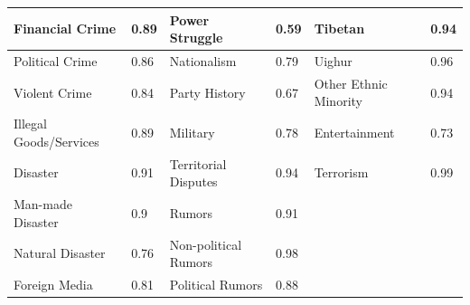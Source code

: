 \documentclass[12pt]{article}
\begin{document}
\begin{CJK*}{UTF8}{gbsn}
\begin{table}[H]
{\begin{tabular}{|p{5cm}|l|p{5cm}|l|p{5cm}|l|}
	Financial Crime & 0.89 & Power Struggle & 0.59 & Tibetan & 0.94\\ \hline
	Political Crime & 0.86 & Nationalism & 0.79 & Uighur & 0.96\\ \hline
	Violent Crime & 0.84 & Party History & 0.67 & Other Ethnic Minority & 0.94\\ \hline
	Illegal Goods/Services & 0.89 & Military & 0.78 & Entertainment & 0.73\\ \hline
	Disaster & 0.91 & Territorial Disputes & 0.94 & Terrorism & 0.99\\ \hline
	Man-made Disaster & 0.9 & Rumors & 0.91 &  & \\ \hline
	Natural Disaster & 0.76 & Non-political Rumors & 0.98 &  & \\ \hline
	Foreign Media & 0.81 & Political Rumors & 0.88 &  & \\ \hline
  \end{tabular}
  }
\end{table}


\newpage



\end{CJK*}
\end{document}
